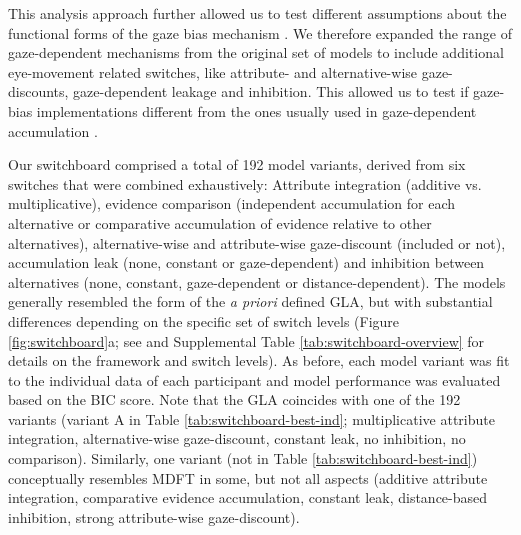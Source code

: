 \documentclass[11pt, a4paper]{article}
\begin{document}
This analysis approach further allowed us to test different assumptions about the functional forms of the gaze bias mechanism \parencite[e.g., as discounting non-ﬁxated alternatives’ values, controlling accumulation leak, among others; see][]{ashby2016FindingRightFit}. We therefore expanded the range of gaze-dependent mechanisms from the original set of models to include additional eye-movement related switches, like attribute- and alternative-wise gaze-discounts, gaze-dependent leakage and inhibition. This allowed us to test if gaze-bias implementations different from the ones usually used in gaze-dependent accumulation \parencite{fisher2017AttentionalDriftDiffusion,krajbich2010VisualFixationsComputation,krajbich2011MultialternativeDriftdiffusionModel,krajbich2012AttentionalDriftdiffusionModel,molter2019GLAMboxPythonToolbox,thomas2019GazeBiasDifferences,smith2018AttentionChoiceDomains,tavares2017AttentionalDriftDiffusion}.

Our switchboard comprised a total of 192 model variants, derived from six switches that were combined exhaustively: Attribute integration (additive vs. multiplicative), evidence comparison (independent accumulation for each alternative or comparative accumulation of evidence relative to other alternatives), alternative-wise and attribute-wise gaze-discount (included or not), accumulation leak (none, constant or gaze-dependent) and inhibition between alternatives (none, constant, gaze-dependent or distance-dependent). The models generally resembled the form of the \emph{a priori} defined GLA, but with substantial differences depending on the specific set of switch levels (Figure \ref{fig:switchboard}a; see  and Supplemental Table \ref{tab:switchboard-overview} for details on the framework and switch levels). As before, each model variant was fit to the individual data of each participant and model performance was evaluated based on the BIC score. Note that the GLA coincides with one of the 192 variants (variant A in Table \ref{tab:switchboard-best-ind}; multiplicative attribute integration, alternative-wise gaze-discount, constant leak, no inhibition, no comparison). Similarly, one variant (not in Table \ref{tab:switchboard-best-ind}) conceptually resembles MDFT in some, but not all aspects (additive attribute integration, comparative evidence accumulation, constant leak, distance-based inhibition, strong attribute-wise gaze-discount).
\end{document}

